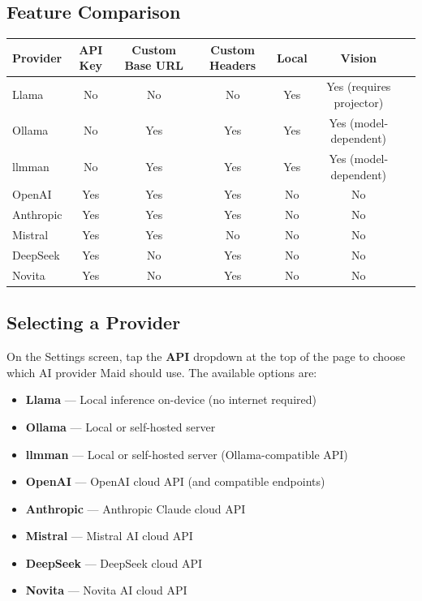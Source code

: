 \documentclass[12pt,a4paper]{article}
\begin{document}
\subsection{Feature Comparison}

\begin{center}
\begin{tabular}{lcccccc}
\toprule
\textbf{Provider} & \textbf{API Key} & \textbf{Custom Base URL} & \textbf{Custom Headers} & \textbf{Local} & \textbf{Vision} \\
\midrule
Llama    & No  & No  & No  & Yes & Yes (requires projector) \\
Ollama   & No  & Yes & Yes & Yes & Yes (model-dependent) \\
llmman   & No  & Yes & Yes & Yes & Yes (model-dependent) \\
OpenAI   & Yes & Yes & Yes & No  & No  \\
Anthropic & Yes & Yes & Yes & No  & No  \\
Mistral  & Yes & Yes & No  & No  & No  \\
DeepSeek & Yes & No  & Yes & No  & No  \\
Novita   & Yes & No  & Yes & No  & No  \\
\bottomrule
\end{tabular}
\end{center}

\subsection{Selecting a Provider}

On the Settings screen, tap the \textbf{API} dropdown at the top of the page to choose which AI provider Maid should use. The available options are:

\begin{itemize}[noitemsep]
    \item \textbf{Llama} — Local inference on-device (no internet required)
    \item \textbf{Ollama} — Local or self-hosted server
    \item \textbf{llmman} — Local or self-hosted server (Ollama-compatible API)
    \item \textbf{OpenAI} — OpenAI cloud API (and compatible endpoints)
    \item \textbf{Anthropic} — Anthropic Claude cloud API
    \item \textbf{Mistral} — Mistral AI cloud API
    \item \textbf{DeepSeek} — DeepSeek cloud API
    \item \textbf{Novita} — Novita AI cloud API
\end{itemize}
\end{document}
